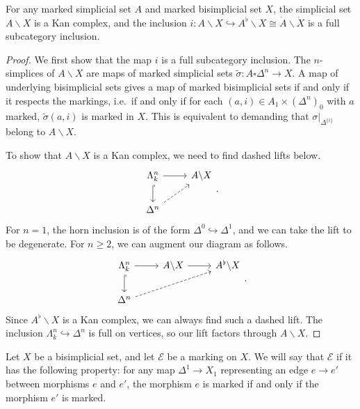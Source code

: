\documentclass[main.tex]{subfiles}
\begin{document}
\begin{lemma}
  For any marked simplicial set $A$ and marked bisimplicial set $X$, the simplicial set $A \backslash X$ is a Kan complex, and the inclusion $i\colon A \backslash X \hookrightarrow A^{\flat} \backslash X \cong \mathring{A} \backslash \mathring{X}$ is a full subcategory inclusion.
\end{lemma}
\begin{proof}
  We first show that the map $i$ is a full subcategory inclusion. The $n$-simplices of $A \backslash X$ are maps of marked simplicial sets $\tilde{\sigma}\colon A \square \Delta^{n} \to X$. A map of underlying bisimplicial sets gives a map of marked bisimplicial sets if and only if it respects the markings, i.e.\ if and only if for each $(a, i) \in A_{1} \times (\Delta^{n})_{0}$ with $a$ marked, $\tilde{\sigma}(a, i)$ is marked in $X$. This is equivalent to demanding that $\sigma|_{\Delta^{\{i\}}}$ belong to $A \backslash X$.

  To show that $A \backslash X$ is a Kan complex, we need to find dashed lifts below.
  \begin{equation*}
    \begin{tikzcd}
      \Lambda^{n}_{k}
      \arrow[r]
      \arrow[d, hook]
      & A \backslash X
      \\
      \Delta^{n}
      \arrow[ur, dashed]
    \end{tikzcd}.
  \end{equation*}
  For $n = 1$, the horn inclusion is of the form $\Delta^{0} \hookrightarrow \Delta^{1}$, and we can take the lift to be degenerate. For $n \geq 2$, we can augment our diagram as follows.
  \begin{equation*}
    \begin{tikzcd}
      \Lambda^{n}_{k}
      \arrow[r]
      \arrow[d, hook]
      & A \backslash X
      \arrow[r]
      & A^{\flat} \backslash X
      \\
      \Delta^{n}
      \arrow[urr, dashed]
    \end{tikzcd}.
  \end{equation*}
  Since $A^{\flat} \backslash X$ is a Kan complex, we can always find such a dashed lift. The inclusion $\Lambda^{n}_{k} \hookrightarrow \Delta^{n}$ is full on vertices, so our lift factors through $A \backslash X$.
\end{proof}

\begin{definition}
  Let $X$ be a bisimplicial set, and let $\mathcal{E}$ be a marking on $X$. We will say that $\mathcal{E}$  if it has the following property: for any map $\Delta^{1} \to X_{1}$ representing an edge $e \to e'$ between morphisms $e$ and $e'$, the morphism $e$ is marked if and only if the morphism $e'$ is marked.
\end{definition}
\end{document}
